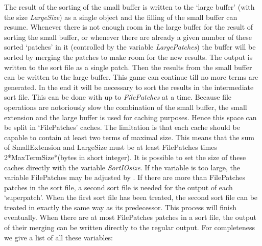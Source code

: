 The result of the sorting of the small buffer is written to the 
`large buffer' (with the size {\sl 
LargeSize}) as a single object and the filling of the 
small buffer can resume. Whenever there is not enough room in the large 
buffer for the result of sorting the small buffer, or whenever there are 
already a given number of these sorted `patches' in it (controlled by the 
variable {\sl LargePatches}) the buffer will be sorted 
by merging the patches to make room for the new results. The 
output is written to the sort file as a single patch. Then the results from 
the small buffer can be written to the large buffer. This game can continue 
till no more terms are generated. In the end it will be necessary to sort 
the results in the intermediate sort file. This can be 
done with up to {\sl FilePatches} at a time. Because 
file operations are notoriously slow the combination of the small buffer, 
the small extension and the large buffer is used for caching 
purposes. Hence this space can be split in `FilePatches' caches. The 
limitation is that each cache should be capable to contain at least two 
terms of maximal size. This means that the sum of SmallExtension and 
LargeSize must be at least FilePatches times 2*MaxTermSize*(bytes in short 
integer). It is possible to set the size of these caches directly with the 
variable {\sl SortIOsize}. If the variable is too large, 
the variable FilePatches may be adjusted by \FORM. If there are more than 
FilePatches patches in the sort file, a second sort file is needed for the 
output of each `superpatch'. When the first sort file has 
been treated, the second sort file can be treated in exactly the same way 
as its predecessor. This process will finish eventually. When there are at 
most FilePatches patches in a sort file, the output of their merging can be 
written directly to the regular output. For completeness we give a list of 
all these variables:



